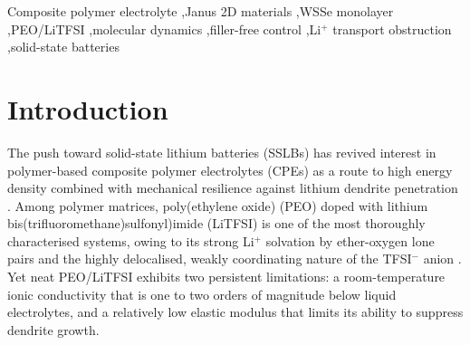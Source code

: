 \documentclass[review, 12pt]{elsarticle}
\numberwithin{equation}{section}
\newcommand{\LiTFSI}{LiTFSI\xspace}
\begin{document}
\begin{frontmatter}
\begin{abstract}
null control in which both faces are made chemically identical should read zero and instead reproduces enrichment ratios of $1.06$--$1.16$, comparable in size to the published effect at several cutoffs. A causal control in which the electrolyte-facing dispersion of the two chalcogens is exchanged leaves the enrichment on the same geometric face rather than following the swapped chemistry ($1.27$--$1.55$, statistically indistinguishable from the unswapped system). Two independent 600~K-repacked replicas disagree with each other on the \emph{sign} of the effect at several cutoffs. We conclude that the apparent Se-face enrichment is dominated by sheet corrugation and finite-sampling estimator bias rather than by Se/S chemistry, and report it as a tested and falsified hypothesis together with the control battery that falsifies it, rather than as a confirmed result. The obstruction and templating effects, by contrast, are established by a direct filler-free comparison and constitute the principal quantitative result of this work.
\end{abstract}

\begin{keyword}
Composite polymer electrolyte \sep Janus 2D materials \sep WSSe monolayer \sep PEO/LiTFSI \sep molecular dynamics \sep filler-free control \sep Li$^+$ transport obstruction \sep solid-state batteries
\end{keyword}

\end{frontmatter}

\section{Introduction}\label{sec:intro}

The push toward solid-state lithium batteries (SSLBs) has revived interest in polymer-based composite polymer electrolytes (CPEs) as a route to high energy density combined with mechanical resilience against lithium dendrite penetration \cite{yang_nml_2023_fillers}. Among polymer matrices, poly(ethylene oxide) (PEO) doped with lithium bis(trifluoromethane)sulfonyl)imide (\LiTFSI) is one of the most thoroughly characterised systems, owing to its strong Li$^+$ solvation by ether-oxygen lone pairs and the highly delocalised, weakly coordinating nature of the TFSI$^-$ anion \cite{gudla_jpcb_2020_polarity, ebadi_electrochim_2017}. Yet neat PEO/\LiTFSI exhibits two persistent limitations: a room-temperature ionic conductivity that is one to two orders of magnitude below liquid electrolytes, and a relatively low elastic modulus that limits its ability to suppress dendrite growth.
\end{document}
